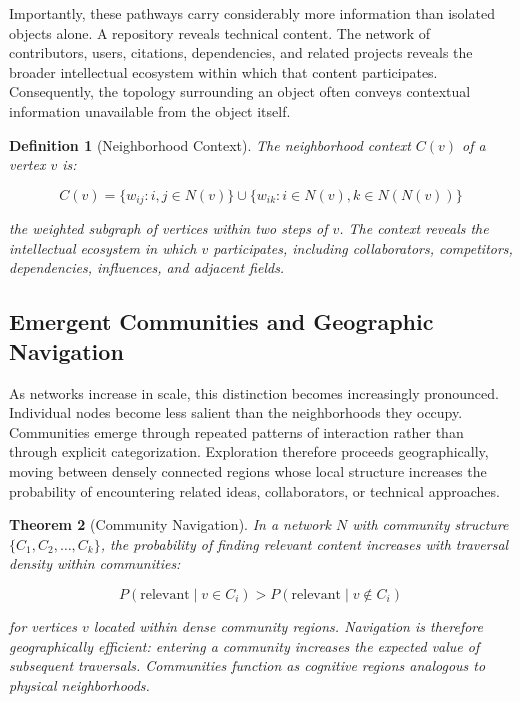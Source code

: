 \documentclass[12pt,oneside]{article}
\newtheorem{definition}{Definition}[section]
\newtheorem{theorem}[definition]{Theorem}
\theoremstyle{remark}
\begin{document}
Importantly, these pathways carry considerably more information than isolated objects alone. A repository reveals technical content. The network of contributors, users, citations, dependencies, and related projects reveals the broader intellectual ecosystem within which that content participates. Consequently, the topology surrounding an object often conveys contextual information unavailable from the object itself.

\begin{definition}[Neighborhood Context]
The neighborhood context $C(v)$ of a vertex $v$ is:

\begin{equation}
C(v) = \{w_{ij} : i, j \in N(v)\} \cup \{w_{ik} : i \in N(v), k \in N(N(v))\}
\end{equation}

the weighted subgraph of vertices within two steps of $v$. The context reveals the intellectual ecosystem in which $v$ participates, including collaborators, competitors, dependencies, influences, and adjacent fields.
\end{definition}

\subsection{Emergent Communities and Geographic Navigation}

As networks increase in scale, this distinction becomes increasingly pronounced. Individual nodes become less salient than the neighborhoods they occupy. Communities emerge through repeated patterns of interaction rather than through explicit categorization. Exploration therefore proceeds geographically, moving between densely connected regions whose local structure increases the probability of encountering related ideas, collaborators, or technical approaches.

\begin{theorem}[Community Navigation]
In a network $N$ with community structure $\{C_1, C_2, \ldots, C_k\}$, the probability of finding relevant content increases with traversal density within communities:

\begin{equation}
P(\text{relevant} \mid v \in C_i) > P(\text{relevant} \mid v \notin C_i)
\end{equation}

for vertices $v$ located within dense community regions. Navigation is therefore geographically efficient: entering a community increases the expected value of subsequent traversals. Communities function as cognitive regions analogous to physical neighborhoods.
\end{theorem}
\end{document}
